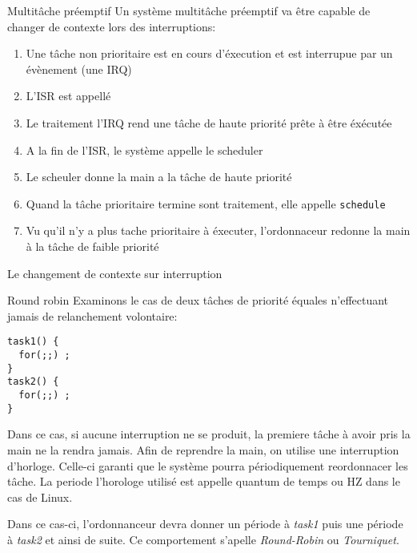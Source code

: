 \begin{frame}{Multitâche préemptif}
  Un  système  multitâche préemptif  va  être  capable  de changer  de
  contexte lors des interruptions:
  \begin{center}
  \end{center}
  \begin{enumerate} 
  \item  Une tâche  non prioritaire  est en  cours d'éxecution  et est
    interrupue par un évènement (une IRQ)
  \item L'ISR est appellé
  \item Le traitement  l'IRQ rend une tâche de  haute priorité prête à
    être éxécutée
  \item A la fin de l'ISR, le système appelle le scheduler
  \item Le scheuler donne la main a la tâche de haute priorité
  \item  Quand  la tâche  prioritaire  termine  sont traitement,  elle
    appelle \texttt{schedule}
  \item   Vu  qu'il  n'y   a  plus   tache  prioritaire   à  éxecuter,
    l'ordonnaceur redonne la main à la tâche de faible priorité
  \end{enumerate} 
\end{frame} 

\begin{frame}{Le changement de contexte sur interruption}
  \begin{center}
  \end{center}
\end{frame} 

\begin{frame}[fragile]{Round robin}
  Examinons  le cas de  deux tâches  de priorité  équales n'effectuant
  jamais de relanchement volontaire:
  \begin{lstlisting} 
task1() {
  for(;;) ;
}
task2() {
  for(;;) ;
}
\end{lstlisting} 
Dans ce cas, si aucune interruption ne se produit, la premiere tâche à
avoir pris la main ne la  rendra jamais. Afin de reprendre la main, on
utilise une  interruption d'horloge.  Celle-ci garanti que  le système
pourra  périodiquement reordonnacer les  tâche. La  periode l'horologe
utilisé est appelle quantum de temps ou HZ dans le cas de Linux.

Dans ce cas-ci, l'ordonnanceur  devra donner un période à \emph{task1}
puis une  période à  \emph{task2} et ainsi  de suite.  Ce comportement
s'apelle \emph{Round-Robin} ou \emph{Tourniquet}.
\end{frame} 

